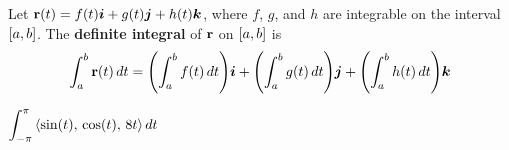\documentclass[mathNotesPreamble]{subfiles}
\begin{document}
  \begin{defn*}
    Let ${\mathbf{r}}(t)=f(t){\bm{i}}+g(t){\bm{j}}+h(t){\bm{k}}$, where $f$, $g$, and $h$ are integrable on the interval ${\left[a,b\right]}$. The \textbf{definite integral} of ${\mathbf{r}}$ on ${\left[a,b\right]}$ is
      \[\int_a^b {\mathbf{r}}(t)\,dt={\left(\int_a^b f(t)\,dt\right)}{\bm{i}}+{\left(\int_a^b g(t)\,dt\right)}{\bm{j}}+{\left(\int_a^b h(t)\,dt\right)}{\bm{k}}\]
  \end{defn*}
  \begin{ex*}
    $\displaystyle \int_{-\pi}^{\pi} {\left\langle \sin(t),\,\cos(t),\, 8t \right\rangle}\,dt$
  \end{ex*}
  \pagebreak

  
\end{document}
